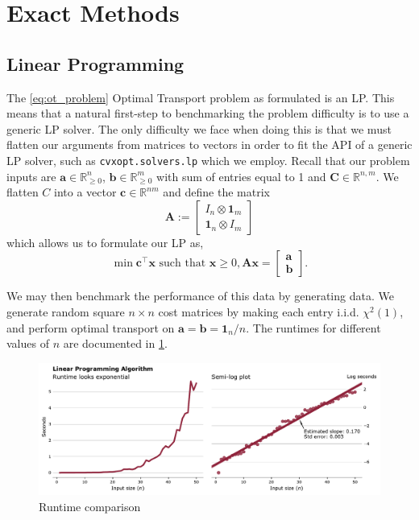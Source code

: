 \documentclass{article}
\theoremstyle{definition}
\theoremstyle{remark}
\begin{document}

\section{Exact Methods}


\subsection{Linear Programming} %
\label{sub:linear_programming}

The \ref{eq:ot_problem} Optimal Transport problem as formulated is an LP. This
means that a natural first-step to benchmarking the problem difficulty is to use
a generic LP solver. The only difficulty we face when doing this is that we must
flatten our arguments from matrices to vectors in order to fit the API of a
generic LP solver, such as \texttt{cvxopt.solvers.lp} which we employ. Recall
that our problem inputs are $\mathbf{a} \in \mathbb{R}^n_{\ge 0}$, $\mathbf{b}
\in \mathbb{R}^m_{\ge 0}$ with sum of entries equal to 1 and $\mathbf{C} \in
\mathbb{R}^{n,m}$. We flatten $C$ into a vector $\mathbf{c} \in \mathbb{R}^{nm}$
and define the matrix
\[ \mathbf{A} := \begin{bmatrix} I_n \otimes \mathbf{1}_m \\ \mathbf{1}_n
\otimes I_m \end{bmatrix} \]
which allows us to formulate our LP as,
\[ \min \mathbf{c}^\top \mathbf{x} \text{ such that } \mathbf{x} \ge 0, \mathbf{A} \mathbf{x} = \begin{bmatrix}
\mathbf{a} \\ \mathbf{b} \end{bmatrix}.\]

We may then benchmark the performance of this data by generating data. We
generate random square $n \times n$ cost matrices by making each entry i.i.d.
$\chi^2(1)$, and perform optimal transport on $\mathbf{a} = \mathbf{b} =
\mathbf{1}_n / n$. The runtimes for different values of $n$ are documented in
\cref{fig:lpruntime}.

\begin{figure}[h]
\includegraphics[width=\textwidth]{../../code/lpruntime}
\caption{Runtime comparison}
\label{fig:lpruntime}
\end{figure}
\end{document}
